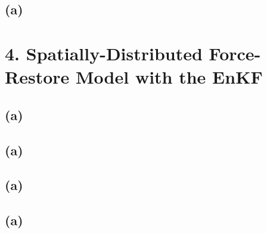 \documentclass[letterpaper]{tufte-handout}
\begin{document}
\subsection{(a)}
\section{4. Spatially-Distributed Force-Restore Model with the EnKF}
\subsection{(a)}
\subsection{(a)}
\subsection{(a)}
\subsection{(a)}
\end{document}
